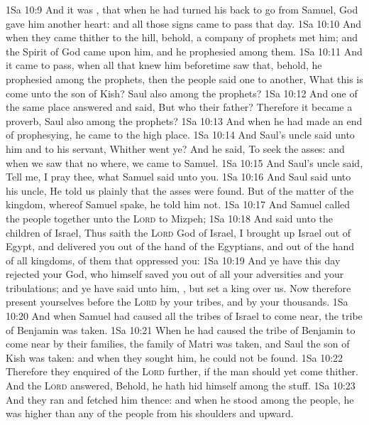\vs 1Sa 10:9 And it was , that when he had turned his back to go from Samuel, God gave him another heart: and all those signs came to pass that day.
\vs 1Sa 10:10 And when they came thither to the hill, behold, a company of prophets met him; and the Spirit of God came upon him, and he prophesied among them.
\vs 1Sa 10:11 And it came to pass, when all that knew him beforetime saw that, behold, he prophesied among the prophets, then the people said one to another, What  this  is come unto the son of Kish?  Saul also among the prophets?
\vs 1Sa 10:12 And one of the same place answered and said, But who  their father? Therefore it became a proverb,  Saul also among the prophets?
\vs 1Sa 10:13 And when he had made an end of prophesying, he came to the high place.
\vs 1Sa 10:14 And Saul's uncle said unto him and to his servant, Whither went ye? And he said, To seek the asses: and when we saw that  no where, we came to Samuel.
\vs 1Sa 10:15 And Saul's uncle said, Tell me, I pray thee, what Samuel said unto you.
\vs 1Sa 10:16 And Saul said unto his uncle, He told us plainly that the asses were found. But of the matter of the kingdom, whereof Samuel spake, he told him not.
\vs 1Sa 10:17 And Samuel called the people together unto the \textsc{Lord} to Mizpeh;
\vs 1Sa 10:18 And said unto the children of Israel, Thus saith the \textsc{Lord} God of Israel, I brought up Israel out of Egypt, and delivered you out of the hand of the Egyptians, and out of the hand of all kingdoms,  of them that oppressed you:
\vs 1Sa 10:19 And ye have this day rejected your God, who himself saved you out of all your adversities and your tribulations; and ye have said unto him, , but set a king over us. Now therefore present yourselves before the \textsc{Lord} by your tribes, and by your thousands.
\vs 1Sa 10:20 And when Samuel had caused all the tribes of Israel to come near, the tribe of Benjamin was taken.
\vs 1Sa 10:21 When he had caused the tribe of Benjamin to come near by their families, the family of Matri was taken, and Saul the son of Kish was taken: and when they sought him, he could not be found.
\vs 1Sa 10:22 Therefore they enquired of the \textsc{Lord} further, if the man should yet come thither. And the \textsc{Lord} answered, Behold, he hath hid himself among the stuff.
\vs 1Sa 10:23 And they ran and fetched him thence: and when he stood among the people, he was higher than any of the people from his shoulders and upward.

